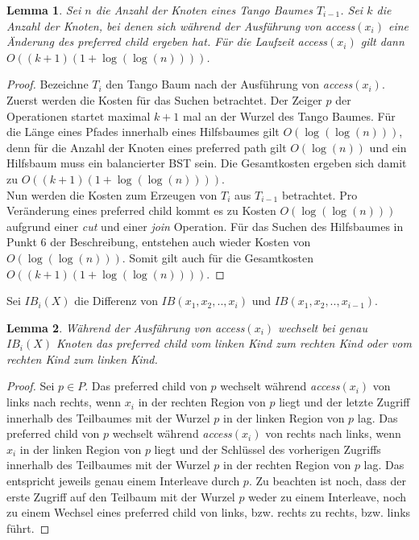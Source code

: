 \documentclass[a4paper,12pt]{article}
\newtheorem{Lemma}{Lemma}[section]
\begin{document}
 
\begin{Lemma} \label{demaineLemma4}
	Sei $n$ die Anzahl der Knoten eines Tango Baumes $T_{i-1}$. Sei $k$ die Anzahl der Knoten, bei denen sich während der Ausführung von \textit{access}$\left(x_i\right)$ eine Änderung des preferred child ergeben hat. Für die Laufzeit \textit{access}$\left(x_i\right)$ gilt dann $O\left(\left(k + 1\right) \left(1 + \log \left( \log  \left(n \right)\right)\right)\right)$.
\end{Lemma}
\begin{proof}
	Bezeichne $T_i$ den Tango Baum nach der Ausführung von \textit{access}$\left(x_i\right)$. Zuerst werden die Kosten für das Suchen betrachtet. Der Zeiger $p$ der Operationen startet maximal $k + 1$ mal an der Wurzel des Tango Baumes. Für die Länge eines Pfades innerhalb eines Hilfsbaumes gilt $O\left(\log \left( \log  \left(n \right)\right)\right)$, denn für die Anzahl der Knoten eines preferred path gilt $O\left( \log \left(n\right)  \right)$ und ein Hilfsbaum muss ein balancierter BST sein. Die Gesamtkosten ergeben sich damit zu $O\left(\left(k + 1\right) \left(1 + \log \left( \log  \left(n \right)\right)\right)\right)$.\\
	Nun werden die Kosten zum Erzeugen von $T_i$ aus $T_{i-1}$ betrachtet. Pro Veränderung eines preferred child kommt es zu Kosten $O\left( \log\left(\log \left(n\right)\right)\right)$ aufgrund einer \textit{cut} und einer \textit{join} Operation. Für das Suchen des Hilfsbaumes in Punkt $6$ der Beschreibung, entstehen auch wieder Kosten von $O\left(\log \left( \log  \left(n \right)\right)\right)$. Somit gilt auch für die Gesamtkosten $O\left(\left(k + 1\right) \left(1 + \log \left( \log  \left(n \right)\right)\right)\right)$.
	
	
\end{proof}
\noindent Sei $\mathit{IB}_i\left(X\right)$ die Differenz von $\mathit{IB}\left(x_1, x_2,..,x_i\right)$ und  $\mathit{IB}\left(x_1, x_2,..,x_{i-1}\right)$. 

\begin{Lemma} \label{demaineLemma5}
	Während der Ausführung von \textit{access}$\left(x_i\right)$ wechselt bei genau $\mathit{IB}_i\left(X\right)$ Knoten das preferred child vom linken Kind zum rechten Kind oder vom rechten Kind zum linken Kind.
\end{Lemma}
\begin{proof}
	Sei $p \in P$. Das preferred child von $p$ wechselt während  \textit{access}$\left(x_i\right)$ von links nach rechts,  wenn $x_i$ in der rechten Region von $p$ liegt und der letzte Zugriff innerhalb des Teilbaumes mit der Wurzel $p$ in der linken Region von $p$ lag.  Das preferred child von $p$ wechselt während  \textit{access}$\left(x_i\right)$ von rechts nach links,  wenn $x_i$ in der linken Region von $p$ liegt und der Schlüssel des vorherigen Zugriffs innerhalb des Teilbaumes mit der Wurzel $p$ in der rechten Region von $p$ lag. Das entspricht jeweils genau einem Interleave durch $p$. Zu beachten ist noch, dass der erste Zugriff auf den Teilbaum mit der Wurzel $p$ weder zu einem Interleave, noch zu einem Wechsel eines preferred child von links, bzw. rechts zu rechts, bzw. links führt. 	
\end{proof}
\end{document}
